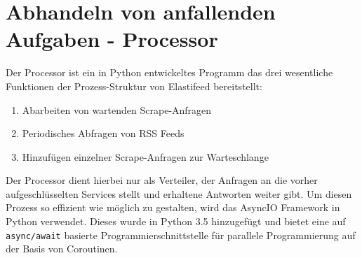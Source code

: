 \section{Abhandeln von anfallenden Aufgaben - Processor}
Der Processor ist ein in Python entwickeltes Programm das drei wesentliche Funktionen der Prozess-Struktur von Elastifeed bereitstellt:
\begin{enumerate}
        \item Abarbeiten von wartenden Scrape-Anfragen
        \item Periodisches Abfragen von RSS Feeds
        \item Hinzufügen einzelner Scrape-Anfragen zur Warteschlange
\end{enumerate}
Der Processor dient hierbei nur als Verteiler, der Anfragen an die vorher aufgeschlüsselten Services stellt und erhaltene Antworten weiter gibt.
Um diesen Prozess so effizient wie möglich zu gestalten, wird das AsyncIO Framework in Python \cite{aiopy} verwendet.
Dieses wurde in Python 3.5 hinzugefügt und bietet eine auf \texttt{async/await} basierte Programmierschnittstelle für parallele Programmierung auf der Basis von Coroutinen.

